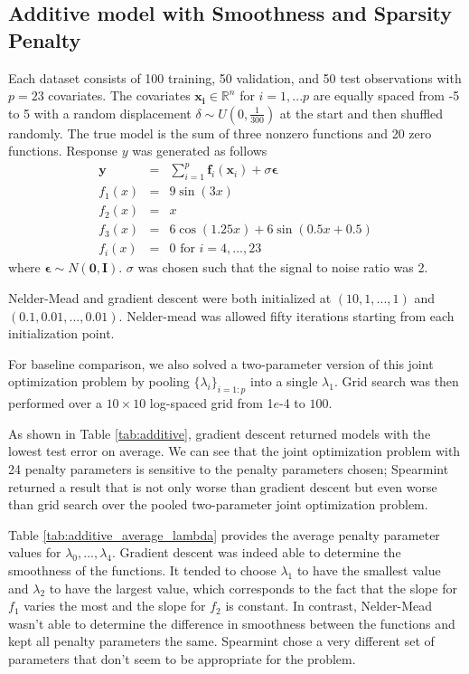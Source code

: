 \documentclass[12pt]{article}
\begin{document}
\subsection{Additive model with Smoothness and Sparsity Penalty}
\label{sec:simulation_sparse_add}
Each dataset consists of 100 training, 50 validation, and 50 test observations with $p=23$ covariates. The covariates $\boldsymbol{x_i} \in \mathbb{R}^{n}$ for $i=1,...p$ are equally spaced from -5 to 5 with a random displacement $ \delta \sim U(0, \frac{1}{300}) $ at the start and then shuffled randomly. The true model is the sum of three nonzero functions and 20 zero functions. Response $y$ was generated as follows
\begin{eqnarray*}
\boldsymbol y &=& \sum\limits_{i=1}^p \boldsymbol f_i(\boldsymbol x_i) + \sigma \boldsymbol \epsilon\\
f_1(x) &=& 9 \sin(3x)\\
f_2(x) &=& x\\
f_3(x) &=& 6 \cos(1.25 x) + 6 \sin(0.5 x + 0.5)\\
f_i(x) &=& 0 \text{ for }   i=4,...,23
\label{eq:simulation_sparse_add}
\end{eqnarray*}
where $\boldsymbol \epsilon \sim N(\boldsymbol 0, \boldsymbol I)$. $\sigma$ was chosen such that the signal to noise ratio was 2.

Nelder-Mead and gradient descent were both initialized at $(10, 1, ..., 1)$ and $(0.1, 0.01, ..., 0.01)$. Nelder-mead was allowed fifty iterations starting from each initialization point.

For baseline comparison, we also solved a two-parameter version of this joint optimization problem by pooling $\{\lambda_i\}_{i=1:p}$ into a single $\lambda_1$. Grid search was then performed over a $10 \times 10$ log-spaced grid from 1$e$-4 to $100$. 

As shown in Table \ref{tab:additive}, gradient descent returned models with the lowest test error on average. We can see that the joint optimization problem with 24 penalty parameters is sensitive to the penalty parameters chosen; Spearmint returned a result that is not only worse than gradient descent but even worse than grid search over the pooled two-parameter joint optimization problem.

Table \ref{tab:additive_average_lambda} provides the average penalty parameter values for $\lambda_0, ..., \lambda_4$. Gradient descent was indeed able to determine the smoothness of the functions. It tended to choose $\lambda_1$ to have the smallest value and $\lambda_2$ to have the largest value, which corresponds to the fact that the slope for $f_1$ varies the most and the slope for $f_2$ is constant. In contrast, Nelder-Mead wasn't able to determine the difference in smoothness between the functions and kept all penalty parameters the same. Spearmint chose a very different set of parameters that don't seem to be appropriate for the problem.
\end{document}
